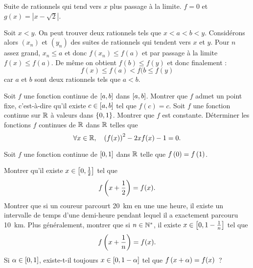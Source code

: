 \documentclass{magnolia}
\begin{document}
\begin{sol}
\begin{questions}
\question 
  \begin{questions}
  \question Suite de rationnels qui tend vers $x$ plus passage à la limite.
  \question $f=0$ et $g(x)=|x-\sqrt{2}|$.
  \end{questions}
\question Soit $x<y$. On peut trouver deux rationnels tels que $x<a<b<y$. Considérons alors $(x_n)$ et $(y_n)$ des suites de rationnels qui tendent vers $x$ et $y$. Pour $n$ assez grand, $x_n\leq a$ et donc $f(x_n)\leq f(a)$ et par passage à la limite $f(x)\leq f(a)$. De même on obtient $f(b)\leq f(y)$ et donc finalement :
$$f(x)\leq f(a)<f(b \leq f(y)$$ car $a$ et $b$ sont deux rationnels tels que $a<b$.
\end{questions}

\end{sol}


\begin{questions}
\question Soit $f$ une fonction continue de $\left[a,b\right]$ dans $\left[a,b\right]$.
  Montrer que $f$ admet un point fixe, c'est-à-dire qu'il existe
  $c\in\left[a,b\right]$ tel que $f(c)=c$.
\question Soit $f$ une fonction continue sur $\mathbb{R}$ à valeurs dans $\left\{0,1\right\}$.
  Montrer que $f$ est constante.
\question Déterminer les fonctions $f$ continues de $\mathbb{R}$ dans $\mathbb{R}$ telles que
  \[\forall x\in\mathbb{R} ,\quad \left(f(x)\right)^2-2xf(x)-1=0.\]
\end{questions}

Soit $f$ une fonction continue de $\left[0,1\right]$ dans $\mathbb{R}$ telle que
$f\left(0\right)=f\left(1\right)$.
\begin{questions}
\question Montrer qu'il existe $x\in\left[0,\frac{1}{2}\right]$ tel que
  \[f\left(x+\frac{1}{2}\right)=f(x).\]
\question 
  Montrer que si un coureur parcourt 20~km en une
  une heure, il existe un intervalle de temps d'une demi-heure pendant lequel
  il a exactement parcouru 10~km.
\question Plus généralement, montrer que si $n\in{\mathbb{N}^*}$, il existe
  $x\in\left[0,1-\frac{1}{n}\right]$ tel que
  \[f\left(x+\frac{1}{n}\right)=f(x).\]
\question Si $\alpha\in\left[0,1\right]$, existe-t-il toujours
  $x\in\left[0,1-\alpha\right]$ tel que $f\left(x+\alpha\right)=f(x)$~?
\end{questions}
\end{document}
